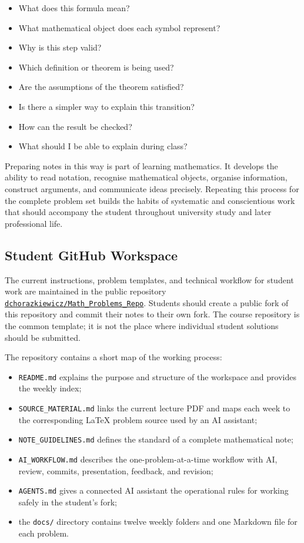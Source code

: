 \begin{itemize}
    \item What does this formula mean?
    \item What mathematical object does each symbol represent?
    \item Why is this step valid?
    \item Which definition or theorem is being used?
    \item Are the assumptions of the theorem satisfied?
    \item Is there a simpler way to explain this transition?
    \item How can the result be checked?
    \item What should I be able to explain during class?
\end{itemize}

Preparing notes in this way is part of learning mathematics. It develops the
ability to read notation, recognise mathematical objects, organise
information, construct arguments, and communicate ideas precisely. Repeating
this process for the complete problem set builds the habits of systematic and
conscientious work that should accompany the student throughout university
study and later professional life.

\subsection{Student GitHub Workspace}

The current instructions, problem templates, and technical workflow for
student work are maintained in the public repository
\href{https://github.com/dchorazkiewicz/Math_Problems_Repo}
{\texttt{dchorazkiewicz/Math\_Problems\_Repo}}. Students should create a public
fork of this repository and commit their notes to their own fork. The course
repository is the common template; it is not the place where individual
student solutions should be submitted.

The repository contains a short map of the working process:

\begin{itemize}
    \item \texttt{README.md} explains the purpose and structure of the
    workspace and provides the weekly index;
    \item \texttt{SOURCE\_MATERIAL.md} links the current lecture PDF and maps
    each week to the corresponding LaTeX problem source used by an AI
    assistant;
    \item \texttt{NOTE\_GUIDELINES.md} defines the standard of a complete
    mathematical note;
    \item \texttt{AI\_WORKFLOW.md} describes the one-problem-at-a-time workflow
    with AI, review, commits, presentation, feedback, and revision;
    \item \texttt{AGENTS.md} gives a connected AI assistant the operational
    rules for working safely in the student's fork;
    \item the \texttt{docs/} directory contains twelve weekly folders and one
    Markdown file for each problem.
\end{itemize}

